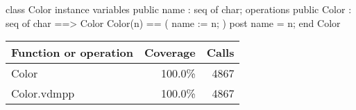 \begin{vdm_al}
class Color
 instance variables
  public name : seq of char;
 operations
  public Color : seq of char ==> Color
   Color(n) ==
   ( 
    name := n;
   )
   post name = n;
end Color
\end{vdm_al}
\bigskip
\begin{longtable}{|l|r|r|}
\hline
Function or operation & Coverage & Calls \\
\hline
\hline
Color & 100.0\% & 4867 \\
\hline
\hline
Color.vdmpp & 100.0\% & 4867 \\
\hline
\end{longtable}

